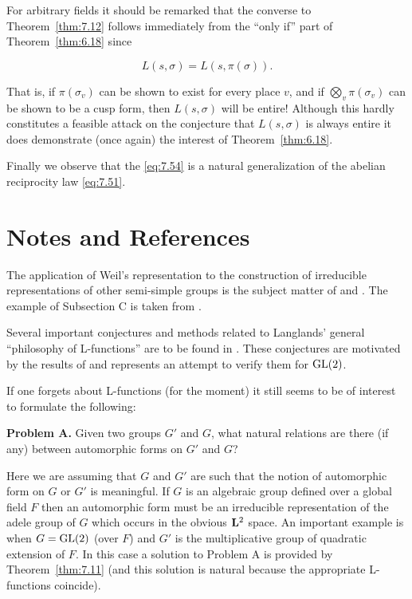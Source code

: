 For arbitrary fields it should be remarked that the converse to Theorem~\ref{thm:7.12} follows immediately from the ``only if'' part of Theorem~\ref{thm:6.18} since

\begin{equation}\label{eq:7.54}
L(s,\sigma) = L(s,\pi(\sigma)).\tag{7.54}
\end{equation}

That is, if $\pi(\sigma_v)$ can be shown to exist for every place $v$, and if $\bigotimes_v \pi(\sigma_v)$ can be shown to be a cusp form, then $L(s,\sigma)$ will be entire! Although this hardly constitutes a feasible attack on the conjecture that $L(s,\sigma)$ is always entire it does demonstrate (once again) the interest of Theorem~\ref{thm:6.18}.

Finally we observe that the \eqref{eq:7.54} is a natural generalization of the abelian reciprocity law \eqref{eq:7.51}.

\section*{Notes and References}


The application of Weil's representation to the construction of irreducible representations of other semi-simple groups is the subject matter of \cite{Gelbart4} and \cite{GrossKunze}. The example of Subsection C is taken from \cite{Gelbart2}.

Several important conjectures and methods related to Langlands' general ``philosophy of L-functions'' are to be found in \cite{Langlands2}. These conjectures are motivated by the results of \cite{Langlands3} and \cite{JacquetLanglands} represents an attempt to verify them for $\operatorname{GL}(2)$.

If one forgets about L-functions (for the moment) it still seems to be of interest to formulate the following:

\textbf{Problem A.} Given two groups $G'$ and $G$, what natural relations are there (if any) between automorphic forms on $G'$ and $G$?

Here we are assuming that $G$ and $G'$ are such that the notion of automorphic form on $G$ or $G'$ is meaningful. If $G$ is an algebraic group defined over a global field $F$ then an automorphic form must be an irreducible representation of the adele group of $G$ which occurs in the obvious $\mathbf{L}^2$ space. An important example is when $G = \operatorname{GL}(2)$ (over $F$) and $G'$ is the multiplicative group of quadratic extension of $F$. In this case a solution to Problem A is provided by Theorem~\ref{thm:7.11} (and this solution is natural because the appropriate L-functions coincide).


